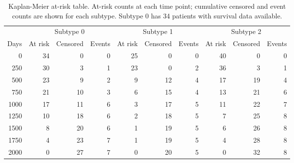 \begin{table}[htbp]
    \centering
    \caption{Kaplan-Meier at-risk table. At-risk counts at each time point;
    cumulative censored and event counts are shown for each subtype. Subtype 0
    has 34 patients with survival data available.}
    \label{tab:app_km_atrisk}
    \setlength{\tabcolsep}{5pt}
    \begin{tabular}{r rrr rrr rrr}
        \toprule
        & \multicolumn{3}{c}{Subtype 0} & \multicolumn{3}{c}{Subtype 1} & \multicolumn{3}{c}{Subtype 2} \\
        \cmidrule(lr){2-4} \cmidrule(lr){5-7} \cmidrule(lr){8-10}
        Days & At risk & Censored & Events & At risk & Censored & Events & At risk & Censored & Events \\
        \midrule
           0 & 34 &  0 &  0 & 25 &  0 &  0 & 40 &  0 &  0 \\
         250 & 30 &  3 &  1 & 23 &  0 &  2 & 36 &  3 &  1 \\
         500 & 23 &  9 &  2 &  9 & 12 &  4 & 17 & 19 &  4 \\
         750 & 21 & 10 &  3 &  6 & 15 &  4 & 13 & 21 &  6 \\
        1000 & 17 & 11 &  6 &  3 & 17 &  5 & 11 & 22 &  7 \\
        1250 & 10 & 18 &  6 &  2 & 18 &  5 &  7 & 25 &  8 \\
        1500 &  8 & 20 &  6 &  1 & 19 &  5 &  6 & 26 &  8 \\
        1750 &  4 & 23 &  7 &  1 & 19 &  5 &  4 & 28 &  8 \\
        2000 &  0 & 27 &  7 &  0 & 20 &  5 &  0 & 32 &  8 \\
        \bottomrule
    \end{tabular}
\end{table}
